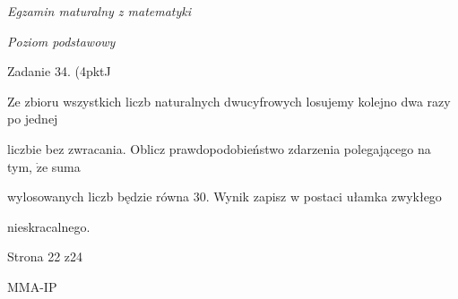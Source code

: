 \documentclass[a4paper,12pt]{article}
\begin{document}
{\it Egzamin maturalny z matematyki}

{\it Poziom podstawowy}

Zadanie 34. (4pktJ

Ze zbioru wszystkich liczb naturalnych dwucyfrowych losujemy kolejno dwa razy po jednej

liczbie bez zwracania. Oblicz prawdopodobieństwo zdarzenia polegającego na tym, $\dot{\mathrm{z}}\mathrm{e}$ suma

wylosowanych liczb będzie równa 30. Wynik zapisz w postaci ułamka zwykłego

nieskracalnego.

Strona 22 z24

MMA-IP
\end{document}
